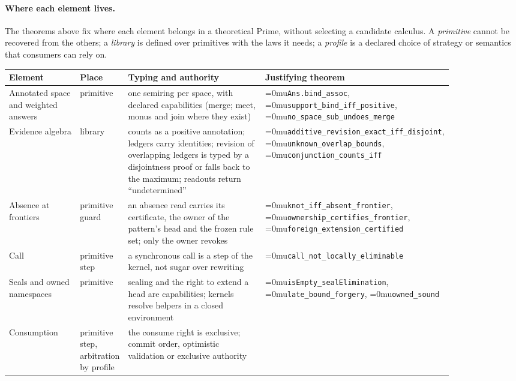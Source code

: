 \documentclass[11pt]{article}
\newcommand{\leanname}[1]{\textup{\Urlmuskip=0mu\relax\nolinkurl{#1}}}
\theoremstyle{definition}
\theoremstyle{remark}
\begin{document}
\paragraph{Where each element lives.}
The theorems above fix where each element belongs in a theoretical Prime,
without selecting a candidate calculus.  A \emph{primitive} cannot be
recovered from the others; a \emph{library} is defined over primitives with
the laws it needs; a \emph{profile} is a declared choice of strategy or
semantics that consumers can rely on.
{\small
\begin{longtable}{>{\raggedright\arraybackslash}p{0.16\linewidth}%
                  >{\raggedright\arraybackslash}p{0.10\linewidth}%
                  >{\raggedright\arraybackslash}p{0.31\linewidth}%
                  >{\raggedright\arraybackslash}p{0.29\linewidth}}
\toprule
Element & Place & Typing and authority & Justifying theorem \\
\midrule
\endhead
Annotated space and weighted answers & primitive & one semiring per space,
  with declared capabilities (merge; meet, monus and join where they exist) &
  \leanname{Ans.bind_assoc}, \leanname{support_bind_iff_positive},
  \leanname{no_space_sub_undoes_merge} \\
Evidence algebra & library & counts as a positive annotation; ledgers carry
  identities; revision of overlapping ledgers is typed by a disjointness proof
  or falls back to the maximum; readouts return ``undetermined'' &
  \leanname{additive_revision_exact_iff_disjoint},
  \leanname{unknown_overlap_bounds}, \leanname{conjunction_counts_iff} \\
Absence at frontiers & primitive guard & an absence read carries its
  certificate, the owner of the pattern's head and the frozen rule set; only
  the owner revokes & \leanname{knot_iff_absent_frontier},
  \leanname{ownership_certifies_frontier}, \leanname{foreign_extension_certified} \\
Call & primitive step & a synchronous call is a step of the kernel, not
  sugar over rewriting & \leanname{call_not_locally_eliminable} \\
Seals and owned namespaces & primitive & sealing and the right to extend a
  head are capabilities; kernels resolve helpers in a closed environment &
  \leanname{isEmpty_sealElimination}, \leanname{late_bound_forgery},
  \leanname{owned_sound} \\
Consumption & primitive step, arbitration by profile & the consume right is
  exclusive; commit order, optimistic validation or exclusive authority

\end{longtable}}
\end{document}
